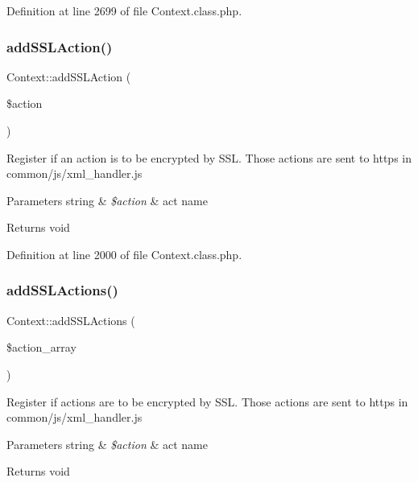 Definition at line 2699 of file Context.\+class.\+php.

\mbox{\label{classContext_a781f5e7a057e6f0992310318a0339ae8}} 
\subsubsection{\texorpdfstring{add\+S\+S\+L\+Action()}{addSSLAction()}}
{\footnotesize\ttfamily Context\+::add\+S\+S\+L\+Action (\begin{DoxyParamCaption}\item[{}]{\$action }\end{DoxyParamCaption})}

Register if an action is to be encrypted by S\+SL. Those actions are sent to https in common/js/xml\+\_\+handler.\+js


\begin{DoxyParams}[1]{Parameters}
string & {\em \$action} & act name \\
\hline
\end{DoxyParams}
\begin{DoxyReturn}{Returns}
void 
\end{DoxyReturn}


Definition at line 2000 of file Context.\+class.\+php.

\mbox{\label{classContext_ab2acd5415515b232b7cf9f0130f4efa3}} 
\subsubsection{\texorpdfstring{add\+S\+S\+L\+Actions()}{addSSLActions()}}
{\footnotesize\ttfamily Context\+::add\+S\+S\+L\+Actions (\begin{DoxyParamCaption}\item[{}]{\$action\+\_\+array }\end{DoxyParamCaption})}

Register if actions are to be encrypted by S\+SL. Those actions are sent to https in common/js/xml\+\_\+handler.\+js


\begin{DoxyParams}[1]{Parameters}
string & {\em \$action} & act name \\
\hline
\end{DoxyParams}
\begin{DoxyReturn}{Returns}
void 
\end{DoxyReturn}


